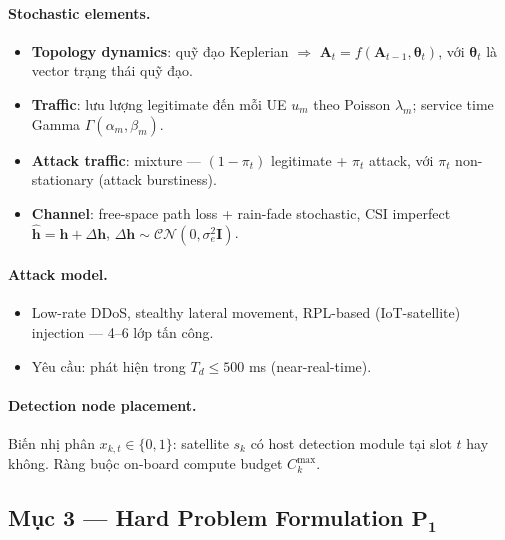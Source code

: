 \documentclass[11pt,a4paper]{article}
\begin{document}
\paragraph{Stochastic elements.}
\begin{itemize}
  \item \textbf{Topology dynamics}: quỹ đạo Keplerian $\Rightarrow$ $\mathbf{A}_t = f(\mathbf{A}_{t-1}, \boldsymbol{\theta}_t)$, với $\boldsymbol{\theta}_t$ là vector trạng thái quỹ đạo.
  \item \textbf{Traffic}: lưu lượng legitimate đến mỗi UE $u_m$ theo Poisson $\lambda_m$; service time Gamma $\Gamma(\alpha_m, \beta_m)$.
  \item \textbf{Attack traffic}: mixture --- $(1-\pi_t)$ legitimate + $\pi_t$ attack, với $\pi_t$ non-stationary (attack burstiness).
  \item \textbf{Channel}: free-space path loss + rain-fade stochastic, CSI imperfect $\hat{\mathbf{h}} = \mathbf{h} + \Delta\mathbf{h}$, $\Delta\mathbf{h} \sim \mathcal{CN}(0, \sigma_e^2 \mathbf{I})$.
\end{itemize}

\paragraph{Attack model.}
\begin{itemize}
  \item Low-rate DDoS, stealthy lateral movement, RPL-based (IoT-satellite) injection --- 4--6 lớp tấn công.
  \item Yêu cầu: phát hiện trong $T_d \leq 500$ ms (near-real-time).
\end{itemize}

\paragraph{Detection node placement.}

Biến nhị phân $x_{k,t} \in \{0,1\}$: satellite $s_k$ có host detection module tại slot $t$ hay không. Ràng buộc on-board compute budget $C_k^{\max}$.

\subsection{Mục 3 --- Hard Problem Formulation $\mathbf{P_1}$}
\end{document}
